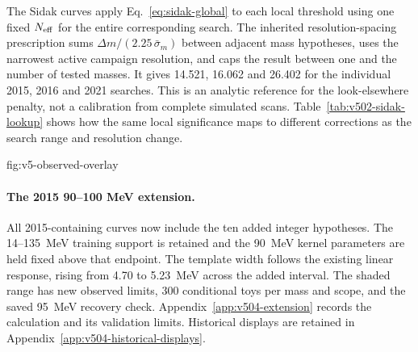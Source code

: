 The Sidak curves apply Eq.~\eqref{eq:sidak-global} to each local threshold
using one fixed $N_{\rm eff}$ for the entire corresponding search.
The inherited resolution-spacing prescription sums
$\Delta m/(2.25\,\bar\sigma_m)$ between adjacent mass hypotheses, uses the
narrowest active campaign resolution, and caps the result between one and
the number of tested masses. It gives 14.521, 16.062 and 26.402 for the
individual 2015, 2016 and 2021 searches. This is an analytic reference for
the look-elsewhere penalty, not a calibration from complete simulated scans.
Table~\ref{tab:v502-sidak-lookup} shows how the same local significance maps
to different corrections as the search range and resolution change.

\begin{table}[htbp]\centering\small

\caption{Local-to-Sidak significance conversion for the declared individual
and complete searches. These are illustrative thresholds passed through the
fixed analytic formula, not additional observed peaks. The final four columns
use the $Z^+$ display convention; signed quantiles and probabilities are
retained in the accompanying numerical tables.}
\label{tab:v502-sidak-lookup}
\end{table}

{fig:v5-observed-overlay}

\FloatBarrier

\paragraph{The 2015 90--100 MeV extension.}
All 2015-containing curves now include the ten added integer hypotheses.
The 14--135~MeV training support is retained and the 90~MeV kernel parameters
are held fixed above that endpoint. The template width follows the existing
linear response, rising from 4.70 to 5.23~MeV across the added interval.
The shaded range has new observed limits, 300 conditional toys per mass and
scope, and the saved 95~MeV recovery check. Appendix~\ref{app:v504-extension}
records the calculation and its validation limits. Historical displays are
retained in Appendix~\ref{app:v504-historical-displays}.
